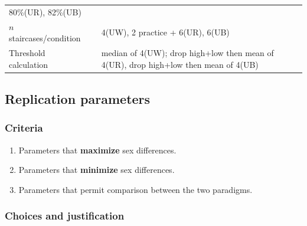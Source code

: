 \documentclass[]{article}
\providecommand{\tightlist}{%
  \setlength{\itemsep}{0pt}\setlength{\parskip}{0pt}}
\begin{document}
\begin{longtable}[]{@{}lll@{}}
\begin{minipage}[t]{0.26\columnwidth}
80\%(UR), 82\%(UB)\strut
\end{minipage}\tabularnewline
\begin{minipage}[t]{0.36\columnwidth}\raggedright
\(n\) staircases/condition\strut
\end{minipage} & \begin{minipage}[t]{0.29\columnwidth}\raggedright
\strut
\end{minipage} & \begin{minipage}[t]{0.26\columnwidth}\raggedright
4(UW), 2 practice + 6(UR), 6(UB)\strut
\end{minipage}\tabularnewline
\begin{minipage}[t]{0.36\columnwidth}\raggedright
Threshold calculation\strut
\end{minipage} & \begin{minipage}[t]{0.29\columnwidth}\raggedright
\strut
\end{minipage} & \begin{minipage}[t]{0.26\columnwidth}\raggedright
median of 4(UW); drop high+low then mean of 4(UR), drop high+low then
mean of 4(UB)\strut
\end{minipage}\tabularnewline
\bottomrule
\end{longtable}

\hypertarget{replication-parameters}{%
\subsection{Replication parameters}\label{replication-parameters}}

\hypertarget{criteria}{%
\subsubsection{Criteria}\label{criteria}}

\begin{enumerate}
\def\labelenumi{\arabic{enumi}.}
\tightlist
\item
  Parameters that \textbf{maximize} sex differences.
\item
  Parameters that \textbf{minimize} sex differences.
\item
  Parameters that permit comparison between the two paradigms.
\end{enumerate}

\hypertarget{choices-and-justification}{%
\subsubsection{Choices and
justification}\label{choices-and-justification}}
\end{document}
